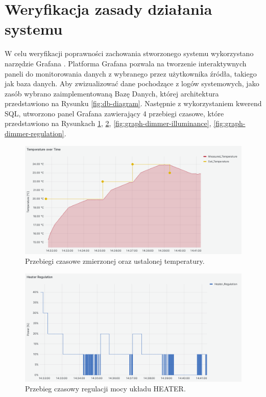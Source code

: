 \section{Weryfikacja zasady działania systemu}

W celu weryfikacji poprawności zachowania stworzonego systemu wykorzystano narzędzie Grafana \cite{grafana}. Platforma Grafana pozwala na tworzenie interaktywnych paneli do monitorowania danych z wybranego przez użytkownika źródła, takiego jak baza danych. Aby zwizualizować dane pochodzące z logów systemowych, jako zasób wybrano zaimplementowaną Bazę Danych, której architektura przedstawiono na Rysunku \ref{fig:db-diagram}. Następnie z wykorzystaniem kwerend SQL, utworzono panel Grafana zawierający 4 przebiegi czasowe, które przedstawiono na Rysunkach \ref{fig:graph-heater-temperature}, \ref{fig:graph-heater-regulation}, \ref{fig:graph-dimmer-illuminance},  \ref{fig:graph-dimmer-regulation}.
    
\begin{figure}[H]
    \centering
    \includegraphics[width=0.8\linewidth]{graphics/grafana/temperature-lm.png}
    \caption{Przebiegi czasowe zmierzonej oraz ustalonej temperatury.}
    \label{fig:graph-heater-temperature}
\end{figure}

\begin{figure}[H]
    \centering
    \includegraphics[width=0.8\linewidth]{graphics/grafana/heater-regulation-lm.png}
    \caption{Przebieg czasowy regulacji mocy układu HEATER.}
    \label{fig:graph-heater-regulation}
\end{figure}

